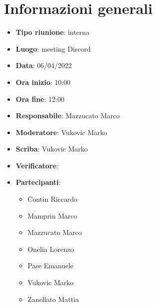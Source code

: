 \section{Informazioni generali}
\begin{itemize}
  \item \textbf{Tipo riunione}: interna
  \item \textbf{Luogo}: meeting Discord
  \item \textbf{Data}: 06/04/2022
  \item \textbf{Ora inizio}: 10:00
  \item \textbf{Ora fine}: 12:00
  \item \textbf{Responsabile}: Mazzucato Marco
  \item \textbf{Moderatore}: Vukovic Marko
  \item \textbf{Scriba}: Vukovic Marko
  \item \textbf{Verificatore}:
  \item \textbf{Partecipanti}:
  \begin{itemize}
    \item Contin Riccardo
    \item Mamprin Marco
    \item Mazzucato Marco
    \item Onelia Lorenzo
    \item Pase Emanuele
    \item Vukovic Marko
    \item Zanellato Mattia
  \end{itemize}
\end{itemize}
